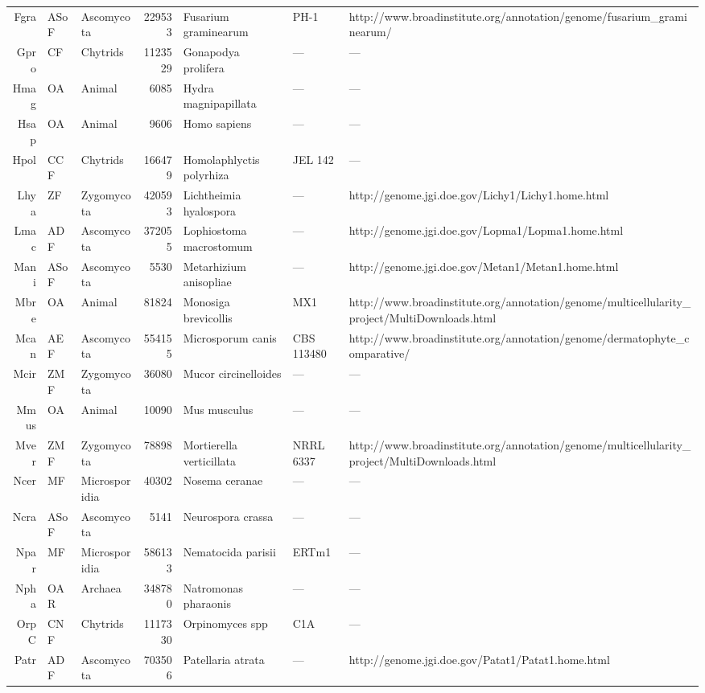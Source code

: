 {\begin{table}[tbp]
\begin{tabular}{rllrlll}
  Fgra & ASoF & Ascomycota & 229533 & Fusarium graminearum  & PH-1 & http://www.broadinstitute.org/annotation/genome/fusarium\_graminearum/ \\ 
  Gpro & CF & Chytrids & 1123529 & Gonapodya prolifera & --- & --- \\ 
  Hmag & OA & Animal & 6085 & Hydra magnipapillata & --- & --- \\ 
  Hsap & OA & Animal & 9606 & Homo sapiens & --- & --- \\ 
  Hpol & CCF & Chytrids & 166479 & Homolaphlyctis polyrhiza & JEL 142 & --- \\ 
  Lhya & ZF & Zygomycota & 420593 & Lichtheimia hyalospora & --- & http://genome.jgi.doe.gov/Lichy1/Lichy1.home.html \\ 
  Lmac & ADF & Ascomycota & 372055 & Lophiostoma macrostomum & --- & http://genome.jgi.doe.gov/Lopma1/Lopma1.home.html \\ 
  Mani & ASoF & Ascomycota & 5530 & Metarhizium anisopliae & --- & http://genome.jgi.doe.gov/Metan1/Metan1.home.html \\ 
  Mbre & OA & Animal & 81824 & Monosiga brevicollis & MX1 & http://www.broadinstitute.org/annotation/genome/multicellularity\_project/MultiDownloads.html \\ 
  Mcan & AEF & Ascomycota & 554155 & Microsporum canis & CBS 113480 & http://www.broadinstitute.org/annotation/genome/dermatophyte\_comparative/ \\ 
  Mcir & ZMF & Zygomycota & 36080 & Mucor circinelloides & --- & --- \\ 
  Mmus & OA & Animal & 10090 & Mus musculus & --- & --- \\ 
  Mver & ZMF & Zygomycota & 78898 & Mortierella verticillata & NRRL 6337 & http://www.broadinstitute.org/annotation/genome/multicellularity\_project/MultiDownloads.html \\ 
  Ncer & MF & Microsporidia & 40302 & Nosema ceranae & --- & --- \\ 
  Ncra & ASoF & Ascomycota & 5141 & Neurospora crassa & --- & --- \\ 
  Npar & MF & Microsporidia & 586133 & Nematocida parisii & ERTm1 & --- \\ 
  Npha & OAR & Archaea & 348780 & Natromonas pharaonis & --- & --- \\ 
  OrpC & CNF & Chytrids & 1117330 & Orpinomyces spp & C1A & --- \\ 
  Patr & ADF & Ascomycota & 703506 & Patellaria atrata & --- & http://genome.jgi.doe.gov/Patat1/Patat1.home.html \\ 

\end{tabular}
\end{table}}
